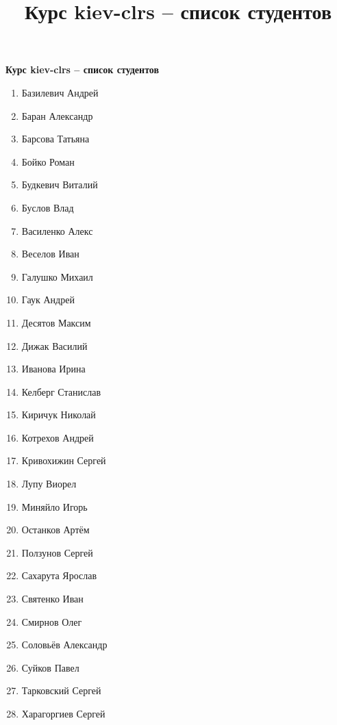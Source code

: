 \documentclass[a4paper,11pt]{article}
\title{Курс kiev-clrs -- список студентов}
\begin{document}
\textbf{Курс kiev-clrs -- список студентов}

\begin{multicols}{2}
\begin{enumerate}

\item Базилевич Андрей
\item Баран Александр
\item Барсова Татьяна
\item Бойко Роман
\item Будкевич Виталий
\item Буслов Влад
\item Василенко Алекс
\item Веселов Иван
\item Галушко Михаил
\item Гаук Андрей
\item Десятов Максим
\item Дижак Василий
\item Иванова Ирина
\item Келберг Станислав
\item Киричук Николай
\item Котрехов Андрей
\item Кривохижин Сергей
\item Лупу Виорел
\item Миняйло Игорь
\item Останков Артём
\item Ползунов Сергей
\item Сахарута Ярослав
\item Святенко Иван
\item Смирнов Олег
\item Соловьёв Александр
\item Суйков Павел
\item Тарковский Сергей
\item Харагоргиев Сергей

\end{enumerate}
\end{multicols}
\end{document}
